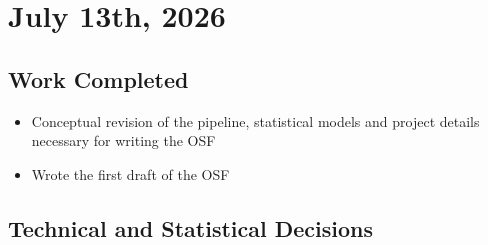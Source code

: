 \documentclass[11pt,a4paper]{article}
\begin{document}
\section{July 13th, 2026}

\subsection{Work Completed}

\begin{itemize}
    \item Conceptual revision of the pipeline, statistical models and project details necessary for writing the OSF
    \item Wrote the first draft of the OSF 

\end{itemize}

\subsection{Technical and Statistical Decisions}
\end{document}
